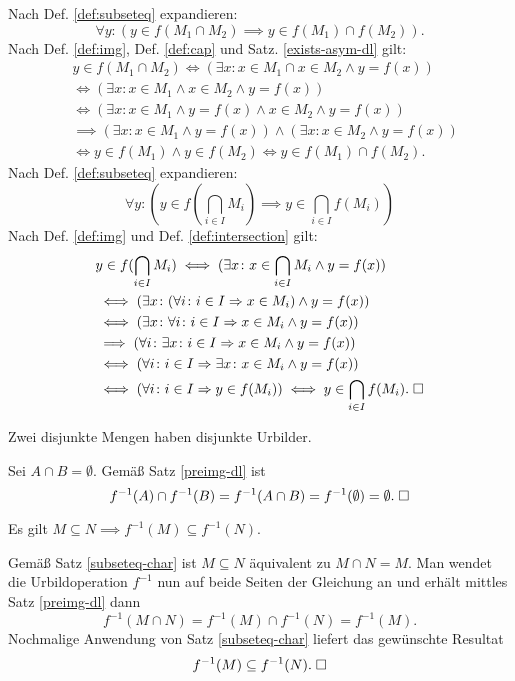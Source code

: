 \begin{Beweis}
Nach Def. \ref{def:subseteq} expandieren:
\[\forall y\colon (y\in f(M_1\cap M_2)\implies y\in f(M_1)\cap f(M_2)).\]
Nach Def. \ref{def:img}, Def. \ref{def:cap}
und Satz. \ref{exists-asym-dl} gilt:
\begin{align*}
& y\in f(M_1\cap M_2) \iff (\exists x\colon x\in M_1\cap x\in M_2\land y=f(x))\\
&\iff (\exists x\colon x\in M_1\land x\in M_2\land y=f(x))\\
&\iff (\exists x\colon x\in M_1\land y=f(x)\land x\in M_2\land y=f(x))\\
&\implies (\exists x\colon x\in M_1\land y=f(x))\land (\exists x\colon x\in M_2\land y=f(x))\\
&\iff y\in f(M_1)\land y\in f(M_2)\iff y\in f(M_1)\cap f(M_2).
\end{align*}
Nach Def. \ref{def:subseteq} expandieren:
\[\forall y\colon (y\in f(\bigcap_{i\in I} M_i)\implies y\in \bigcap_{i\in I} f(M_i))\]
Nach Def. \ref{def:img} und Def. \ref{def:intersection} gilt:
\begin{align*}
& y\in f(\bigcap_{i\in I} M_i)\iff (\exists x\colon x\in\bigcap_{i\in I} M_i\land y=f(x))\\
& \iff (\exists x\colon (\forall i\colon i\in I\Rightarrow x\in M_i)\land y=f(x))\\
& \iff (\exists x\colon \forall i\colon i\in I\Rightarrow x\in M_i\land y=f(x))\\
& \implies (\forall i\colon\exists x\colon i\in I\Rightarrow x\in M_i\land y=f(x))\\
& \iff (\forall i\colon i\in I\Rightarrow \exists x\colon x\in M_i\land y=f(x))\\
& \iff (\forall i\colon i\in I\Rightarrow y\in f(M_i))
\iff y\in\bigcap_{i\in I} f(M_i).\;\square
\end{align*}
\end{Beweis}

\begin{Satz}\label{disjoint-preimg}
Zwei disjunkte Mengen haben disjunkte Urbilder.
\end{Satz}
\begin{Beweis} Sei $A\cap B=\emptyset$. Gemäß Satz
\ref{preimg-dl} ist
\[f^{-1}(A)\cap f^{-1}(B) = f^{-1}(A\cap B) = f^{-1}(\emptyset)
= \emptyset.\;\square\]
\end{Beweis}

\begin{Satz}
Es gilt $M\subseteq N\implies f^{-1}(M)\subseteq f^{-1}(N)$.
\end{Satz}
\begin{Beweis}[Beweis\;1]
Gemäß Satz \ref{subseteq-char} ist $M\subseteq N$ äquivalent zu
$M\cap N=M$. Man wendet die Urbildoperation $f^{-1}$ nun auf beide
Seiten der Gleichung an und erhält mittles Satz \ref{preimg-dl}
dann%
\[f^{-1}(M\cap N) = f^{-1}(M)\cap f^{-1}(N) = f^{-1}(M).\]
Nochmalige Anwendung von Satz \ref{subseteq-char} liefert
das gewünschte Resultat
\[f^{-1}(M)\subseteq f^{-1}(N).\;\square\]
\end{Beweis}

